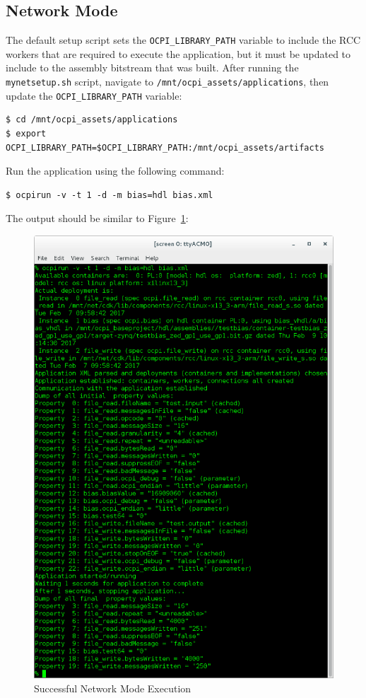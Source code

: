 \subsection{Network Mode}
The default setup script sets the \texttt{OCPI\_LIBRARY\_PATH} variable to include the RCC workers that are required to execute the application, but it must be updated to include to the assembly bitstream that was built.  After running the \texttt{mynetsetup.sh} script, navigate to  \texttt{/mnt/ocpi\_assets/applications}, then update the \texttt{OCPI\_LIBRARY\_PATH} variable:
\begin{verbatim}
$ cd /mnt/ocpi_assets/applications
$ export OCPI_LIBRARY_PATH=$OCPI_LIBRARY_PATH:/mnt/ocpi_assets/artifacts
\end{verbatim}
Run the application using the following command:
\begin{verbatim}
$ ocpirun -v -t 1 -d -m bias=hdl bias.xml
\end{verbatim}
The output should be similar to Figure~\ref{fig:netBias}:
\begin{figure}[H]
	\centerline{\includegraphics[scale=0.45]{zed_net_bias}}
	\caption{Successful Network Mode Execution}
	\label{fig:netBias}
\end{figure}

